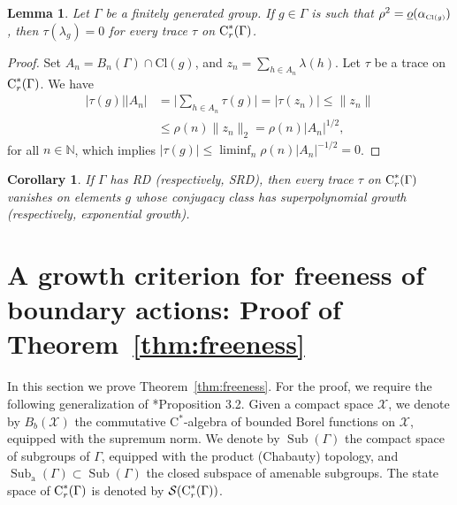 \documentclass[12pt]{amsart}
\newtheorem{cor}[theorem]{Corollary}
\newtheorem{lem}[theorem]{Lemma}
\theoremstyle{definition}
\theoremstyle{remark}
\newcommand{\bN}{{\mathbb{N}}}
\newcommand{\Sub}{\operatorname{Sub}}
\newcommand{\G}{\Gamma}
\begin{document}
\begin{lem}\label{lem:gong}
Let $\G$ be a finitely generated group. If $g\in\Gamma$ is such that 
$\rho^2=\underline{o}(\alpha_{\scriptscriptstyle \textup{Cl}(g)})$, then $\tau(\lambda_g)=0$ for every trace $\tau$ on $\textup{C}^*_r(\Gamma)$.
\end{lem}

\begin{proof}
Set $A_n = B_n(\G)\cap \text{Cl}(g)$, and $z_n = \sum_{h\in A_n}\lambda(h)$.
Let $\tau$ be a trace on $\textup{C}^*_r(\Gamma)$. We have
\[\begin{split}
|\tau(g)||A_n| &= \big|\sum_{h\in A_n}\tau(g)\big| = |\tau(z_n)|\leq \|z_n\|\\&\leq \rho(n)\|z_n\|_2 = \rho(n)|A_n|^{1/2},
\end{split}\]
for all $n\in\bN$, which implies $|\tau(g)|\le \liminf_n \rho(n) |A_n|^{-1/2}= 0$.
\end{proof}

\begin{cor}
If $\G$ has \textup{RD} \textup{(}respectively, \textup{SRD}\textup{)}, then every trace $\tau$ on $\textup{C}^*_r(\Gamma)$ vanishes on elements $g$ whose conjugacy class has superpolynomial growth \textup{(}respectively, exponential growth\textup{)}.
\end{cor}




\section{A growth criterion for freeness of boundary actions: Proof of Theorem~\ref{thm:freeness}}


In this section we prove Theorem~\ref{thm:freeness}.  
For the proof, we require the following generalization of \cite{Ken15}*{Proposition 3.2}. Given a compact space $\mathcal{X}$, we denote by $B_b(\mathcal{X})$ the commutative C$^*$-algebra of bounded Borel functions on $\mathcal{X}$, equipped with the supremum norm. We denote by $\Sub(\Gamma)$ the compact space of subgroups of $\Gamma$, equipped with the product (Chabauty) topology, and $\Sub_\text{a}(\Gamma)\subset \Sub(\Gamma)$ the closed subspace of amenable subgroups. The state space of $\textup{C}^*_r(\Gamma)$ is denoted by $\mathcal{S}(\textup{C}^*_r(\Gamma))$.
\end{document}
